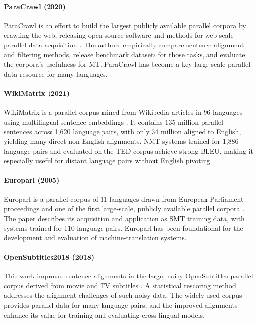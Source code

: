 \documentclass[letterpaper]{article}
\begin{document}
\paragraph{ParaCrawl (2020)} ParaCrawl is an effort to build the largest publicly available parallel corpora by crawling the web, releasing open-source software and methods for web-scale parallel-data acquisition \citep{banon-etal-2020-paracrawl}. The authors empirically compare sentence-alignment and filtering methods, release benchmark datasets for those tasks, and evaluate the corpora's usefulness for MT. ParaCrawl has become a key large-scale parallel-data resource for many languages.

\paragraph{WikiMatrix (2021)} WikiMatrix is a parallel corpus mined from Wikipedia articles in 96 languages using multilingual sentence embeddings \citep{schwenk-etal-2021-wikimatrix}. It contains 135 million parallel sentences across 1,620 language pairs, with only 34 million aligned to English, yielding many direct non-English alignments. NMT systems trained for 1,886 language pairs and evaluated on the TED corpus achieve strong BLEU, making it especially useful for distant language pairs without English pivoting.

\paragraph{Europarl (2005)} Europarl is a parallel corpus of 11 languages drawn from European Parliament proceedings and one of the first large-scale, publicly available parallel corpora \citep{koehn-2005-europarl}. The paper describes its acquisition and application as SMT training data, with systems trained for 110 language pairs. Europarl has been foundational for the development and evaluation of machine-translation systems.

\paragraph{OpenSubtitles2018 (2018)} This work improves sentence alignments in the large, noisy OpenSubtitles parallel corpus derived from movie and TV subtitles \citep{lison-etal-2018-opensubtitles2018}. A statistical rescoring method addresses the alignment challenges of such noisy data. The widely used corpus provides parallel data for many language pairs, and the improved alignments enhance its value for training and evaluating cross-lingual models.
\end{document}
